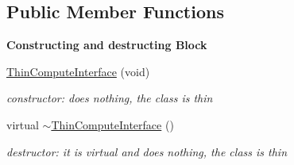 \subsection*{Public Member Functions}
\begin{Indent}\textbf{ Constructing and destructing Block}\par
\begin{DoxyCompactItemize}
\item 
\mbox{\label{class_s_m_spp__di__unipi__it_1_1_thin_compute_interface_ae8f8f94b2a872cc4c374a584503f6daa}} 
\mbox{\hyperlink{class_s_m_spp__di__unipi__it_1_1_thin_compute_interface_ae8f8f94b2a872cc4c374a584503f6daa}{Thin\+Compute\+Interface}} (void)
\begin{DoxyCompactList}\small\item\em constructor\+: does nothing, the class is thin \end{DoxyCompactList}\item 
\mbox{\label{class_s_m_spp__di__unipi__it_1_1_thin_compute_interface_acba9c2f3ff02524cab66da825d815447}} 
virtual \mbox{\hyperlink{class_s_m_spp__di__unipi__it_1_1_thin_compute_interface_acba9c2f3ff02524cab66da825d815447}{$\sim$\+Thin\+Compute\+Interface}} ()
\begin{DoxyCompactList}\small\item\em destructor\+: it is virtual and does nothing, the class is thin \end{DoxyCompactList}\end{DoxyCompactItemize}
\end{Indent}
